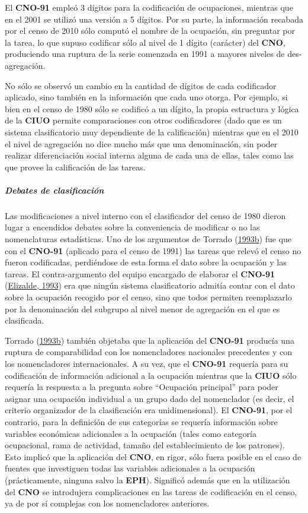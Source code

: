 \documentclass[
]{article}
\begin{document}
El \textbf{CNO-91} empleó 3 dígitos para la codificación de ocupaciones, mientras que en el 2001 se utilizó una versión a 5 dígitos. Por su parte, la información recabada por el censo de 2010 sólo computó el nombre de la ocupación, sin preguntar por la tarea, lo que supuso codificar sólo al nivel de 1 dígito (carácter) del \textbf{CNO}, produciendo una ruptura de la serie comenzada en 1991 a mayores niveles de des-agregación.

No sólo se observó un cambio en la cantidad de dígitos de cada codificador aplicado, sino también en la información que cada uno otorga. Por ejemplo, si bien en el censo de 1980 sólo se codificó a un dígito, la propia estructura y lógica de la \textbf{CIUO} permite comparaciones con otros codificadores (dado que es un sistema clasificatorio muy dependiente de la calificación) mientras que en el 2010 el nivel de agregación no dice mucho más que una denominación, sin poder realizar diferenciación social interna alguna de cada una de ellas, tales como las que provee la calificación de las tareas.

\hypertarget{debates-de-clasificaciuxf3n}{%
\subparagraph{Debates de clasificación}\label{debates-de-clasificaciuxf3n}}

Las modificaciones a nivel interno con el clasificador del censo de 1980 dieron lugar a encendidos debates sobre la conveniencia de modificar o no las nomenclaturas estadísticas. Uno de los argumentos de Torrado (\protect\hyperlink{ref-Torrado1993a}{1993b}) fue que con el \textbf{CNO-91} (aplicado para el censo de 1991) las tareas que relevó el censo no fueron codificadas, perdiéndose de esta forma el dato sobre la ocupación y las tareas. El contra-argumento del equipo encargado de elaborar el \textbf{CNO-91} (\protect\hyperlink{ref-Elizalde1993}{Elizalde, 1993}) era que ningún sistema clasificatorio admitía contar con el dato sobre la ocupación recogido por el censo, sino que todos permiten reemplazarlo por la denominación del subgrupo al nivel menor de agregación en el que es clasificada.

Torrado (\protect\hyperlink{ref-Torrado1993a}{1993b}) también objetaba que la aplicación del \textbf{CNO-91} producía una ruptura de comparabilidad con los nomencladores nacionales precedentes y con los nomencladores internacionales. A su vez, que el \textbf{CNO-91} requería para su codificación de información adicional a la ocupación mientras que la \textbf{CIUO} sólo requería la respuesta a la pregunta sobre ``Ocupación principal'' para poder asignar una ocupación individual a un grupo dado del nomenclador (es decir, el criterio organizador de la clasificación era unidimensional). El \textbf{CNO-91}, por el contrario, para la definición de sus categorías se requería información sobre variables económicas adicionales a la ocupación (tales como categoría ocupacional, rama de actividad, tamaño del establecimiento de los patrones). Esto implicó que la aplicación del \textbf{CNO}, en rigor, sólo fuera posible en el caso de fuentes que investiguen todas las variables adicionales a la ocupación (prácticamente, ninguna salvo la \textbf{EPH}). Significó además que en la utilización del \textbf{CNO} se introdujera complicaciones en las tareas de codificación en el censo, ya de por sí complejas con los nomencladores anteriores.
\end{document}
